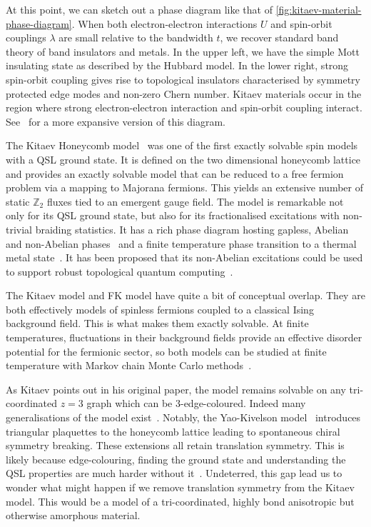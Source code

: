At this point, we can sketch out a phase diagram like that of \cref{fig:kitaev-material-phase-diagram}. When both electron-electron interactions \(U\) and spin-orbit couplings \(\lambda\) are small relative to the bandwidth \(t\), we recover standard band theory of band insulators and metals. In the upper left, we have the simple Mott insulating state as described by the Hubbard model. In the lower right, strong spin-orbit coupling gives rise to topological insulators characterised by symmetry protected edge modes and non-zero Chern number. Kitaev materials occur in the region where strong electron-electron interaction and spin-orbit coupling interact. See~\autocite{witczak-krempaCorrelatedQuantumPhenomena2014} for a more expansive version of this diagram.

The Kitaev Honeycomb model~\autocite{kitaevAnyonsExactlySolved2006} was one of the first exactly solvable spin models with a QSL ground state. It is defined on the two dimensional honeycomb lattice and provides an exactly solvable model that can be reduced to a free fermion problem via a mapping to Majorana fermions. This yields an extensive number of static \(\mathbb Z_2\) fluxes tied to an emergent gauge field. The model is remarkable not only for its QSL ground state, but also for its fractionalised excitations with non-trivial braiding statistics. It has a rich phase diagram hosting gapless, Abelian and non-Abelian phases~\autocite{knolleDynamicsFractionalizationQuantum2015} and a finite temperature phase transition to a thermal metal state~\autocite{selfThermallyInducedMetallic2019}. It has been proposed that its non-Abelian excitations could be used to support robust topological quantum computing~\autocite{kitaev_fault-tolerant_2003,freedmanTopologicalQuantumComputation2003,nayakNonAbelianAnyonsTopological2008}.

The Kitaev model and FK model have quite a bit of conceptual overlap. They are both effectively models of spinless fermions coupled to a classical Ising background field. This is what makes them exactly solvable. At finite temperatures, fluctuations in their background fields provide an effective disorder potential for the fermionic sector, so both models can be studied at finite temperature with Markov chain Monte Carlo methods~\autocite{antipovInteractionTunedAndersonMott2016,selfThermallyInducedMetallic2019}.

As Kitaev points out in his original paper, the model remains solvable on any tri-coordinated \(z=3\) graph which can be 3-edge-coloured. Indeed many generalisations of the model exist~\autocite{Baskaran2007,Baskaran2008,Nussinov2009,OBrienPRB2016,hermanns2015weyl}. Notably, the Yao-Kivelson model~\autocite{yaoExactChiralSpin2007} introduces triangular plaquettes to the honeycomb lattice leading to spontaneous chiral symmetry breaking. These extensions all retain translation symmetry. This is likely because edge-colouring, finding the ground state and understanding the QSL properties are much harder without it~\autocite{eschmann2019thermodynamics,Peri2020}. Undeterred, this gap lead us to wonder what might happen if we remove translation symmetry from the Kitaev model. This would be a model of a tri-coordinated, highly bond anisotropic but otherwise amorphous material.

